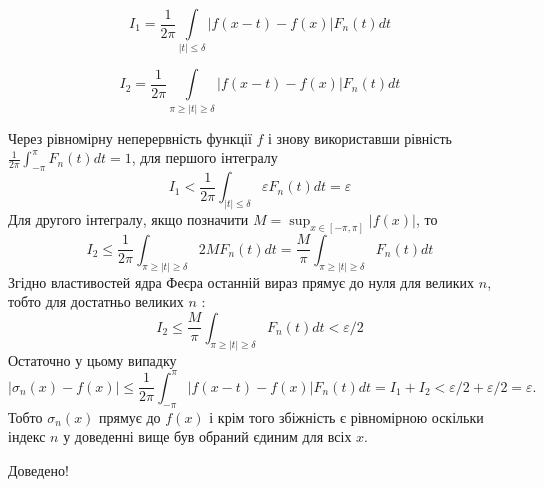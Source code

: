$$I_1=\frac{1}{2 \pi} \int\limits_{|t| \leqslant \delta}
|f(x-t)-f(x)| F_n(t) d t$$


$$I_2=\frac{1}{2 \pi} \int\limits_{\pi \geqslant|t| \geqslant \delta}
|f(x-t)-f(x)| F_n(t) d t$$


Через рівномірну неперервність функції $f$ і знову використавши рівність $\frac{1}{2 \pi} \int_{-\pi}^\pi F_n(t) d t=1$, для першого інтегралу
$$
I_1<\frac{1}{2 \pi} \int_{|t| \leqslant \delta} \varepsilon F_n(t) d t=\varepsilon
$$
Для другого інтегралу, якщо позначити $M=\sup _{x \in[-\pi, \pi]}|f(x)|$, то
$$
I_2 \leqslant \frac{1}{2 \pi} \int_{\pi \geqslant|t| \geqslant \delta} 2 M F_n(t) d t=\frac{M}{\pi} \int_{\pi \geqslant|t| \geqslant \delta} F_n(t) d t
$$
Згідно властивостей ядра Феєра останній вираз прямує до нуля для великих $n$, тобто для достатньо великих $n$ :
$$
I_2 \leqslant \frac{M}{\pi} \int_{\pi \geqslant|t| \geqslant \delta} F_n(t) d t<\varepsilon / 2
$$
Остаточно у цьому випадку
$$
\left|\sigma_n(x)-f(x)\right| \leqslant \frac{1}{2 \pi} \int_{-\pi}^\pi|f(x-t)-f(x)| F_n(t) d t=I_1+I_2<\varepsilon / 2+\varepsilon / 2=\varepsilon .
$$
Тобто $\sigma_n(x)$ прямує до $f(x)$ і крім того збіжність є рівномірною оскільки індекс $n$ у доведенні вище був обраний єдиним для всіх $x$.


Доведено!

